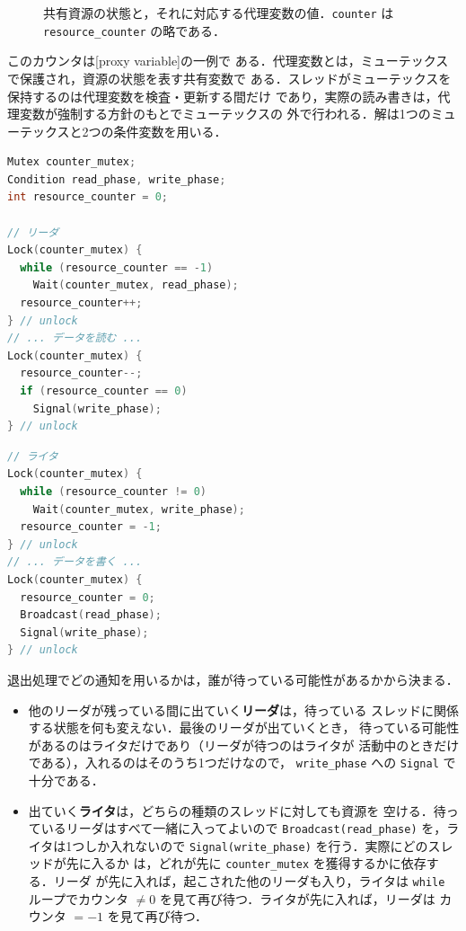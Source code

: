 \documentclass[../main.tex]{subfiles}
\begin{document}
\begin{figure}[htbp]
  \centering
  
  \caption{共有資源の状態と，それに対応する代理変数の値．\texttt{counter}
    は \texttt{resource\_counter} の略である．}
  \label{fig:l03-rw-states}
\end{figure}

このカウンタは[proxy variable]の一例で
ある．代理変数とは，ミューテックスで保護され，資源の状態を表す共有変数で
ある．スレッドがミューテックスを保持するのは代理変数を検査・更新する間だけ
であり，実際の読み書きは，代理変数が強制する方針のもとでミューテックスの
外で行われる．解は1つのミューテックスと2つの条件変数を用いる．
\begin{lstlisting}[language=C, numbers=none]
Mutex counter_mutex;
Condition read_phase, write_phase;
int resource_counter = 0;

// リーダ
Lock(counter_mutex) {
  while (resource_counter == -1)
    Wait(counter_mutex, read_phase);
  resource_counter++;
} // unlock
// ... データを読む ...
Lock(counter_mutex) {
  resource_counter--;
  if (resource_counter == 0)
    Signal(write_phase);
} // unlock
\end{lstlisting}
\begin{lstlisting}[language=C, numbers=none]
// ライタ
Lock(counter_mutex) {
  while (resource_counter != 0)
    Wait(counter_mutex, write_phase);
  resource_counter = -1;
} // unlock
// ... データを書く ...
Lock(counter_mutex) {
  resource_counter = 0;
  Broadcast(read_phase);
  Signal(write_phase);
} // unlock
\end{lstlisting}

退出処理でどの通知を用いるかは，誰が待っている可能性があるかから決まる．%
\begin{itemize}
  \item 他のリーダが残っている間に出ていく\textbf{リーダ}は，待っている
    スレッドに関係する状態を何も変えない．最後のリーダが出ていくとき，
    待っている可能性があるのはライタだけであり（リーダが待つのはライタが
    活動中のときだけである），入れるのはそのうち1つだけなので，
    \texttt{write\_phase} への \texttt{Signal} で十分である．
  \item 出ていく\textbf{ライタ}は，どちらの種類のスレッドに対しても資源を
    空ける．待っているリーダはすべて一緒に入ってよいので
    \texttt{Broadcast(read\_phase)} を，ライタは1つしか入れないので
    \texttt{Signal(write\_phase)} を行う．実際にどのスレッドが先に入るか
    は，どれが先に \texttt{counter\_mutex} を獲得するかに依存する．リーダ
    が先に入れば，起こされた他のリーダも入り，ライタは \texttt{while}
    ループでカウンタ $\neq 0$ を見て再び待つ．ライタが先に入れば，リーダは
    カウンタ $=-1$ を見て再び待つ．
\end{itemize}
\end{document}
